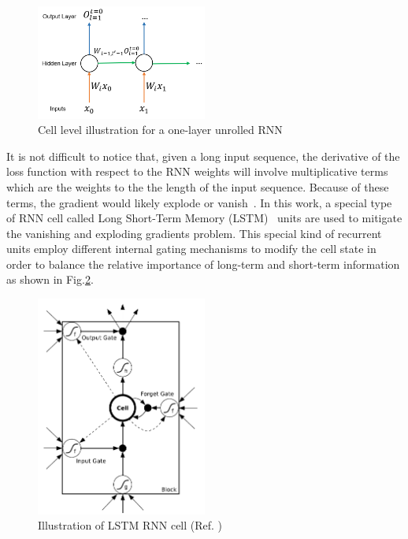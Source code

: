 \begin{figure}[htbp]
  \centering
   \includegraphics[width=0.5\textwidth]{figures/RNN/RNNIlustration.png}
\caption{Cell level illustration for a one-layer unrolled RNN}
  \label{fig:rnn_ilustration}
\end{figure}



It is not difficult to notice that, given a long input sequence, the derivative of the loss function with respect to the RNN weights will involve multiplicative terms which are the weights to the the length of the input sequence. Because of these terms, the gradient would likely explode or vanish~\cite{hochreiter1991untersuchungen,Bengio:1994:LLD:2325857.2328340,DBLP:journals/corr/abs-1211-5063}. In this work, a special type of RNN cell called Long Short-Term Memory (LSTM)~\cite{ref:LSTM} units are used to mitigate the vanishing and exploding gradients problem. This special kind of recurrent units employ different internal gating mechanisms to modify the cell state in order to balance the relative importance of long-term and short-term information as shown in Fig.\ref{fig:lstm_cell}. 


\begin{figure}[htbp]
  \centering
   \includegraphics[width=0.5\textwidth]{figures/RNN/LSTM.png}
\caption{Illustration of LSTM RNN cell (Ref. \cite{ref:RNNthesis})}
  \label{fig:lstm_cell}
\end{figure}

